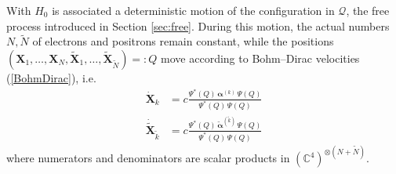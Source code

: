 \documentclass[12pt]{article}
\newcommand{\CCC}{\mathbb{C}} %
\newcommand{\1}{\mathbf{1}} %
\newcommand{\conf}{\mathcal{Q}} %
\newcommand{\vX}{\boldsymbol X}
\newcommand{\valpha}{{\boldsymbol \alpha}}
\newcommand{\pN}{{\widetilde{N}}}
\newcommand{\pk}{{\widetilde{k}}}
\newcommand{\pvX}{\widetilde{\boldsymbol X}}
\newcommand{\palpha}{\widetilde\valpha}
\begin{document}
With $H_0$ is associated a deterministic motion of the configuration
in $\conf$, the free process introduced in Section \ref{sec:free}.
During this motion, the actual numbers $N, \pN$ of electrons and
positrons remain constant, while the positions $(\vX_1, \ldots, \vX_N,
\pvX_1, \ldots, \pvX_\pN)=:Q$ move according to Bohm--Dirac velocities
(\ref{BohmDirac}), i.e.
\begin{subequations}\label{elposmotion}
\begin{align}
   \dot{\vX}_k &= c\frac{\Psi^*(Q) \, \valpha^{(k)} \, \Psi(Q)}
   {\Psi^*(Q) \, \Psi(Q)} \\
   \dot{\pvX}_\pk &= c\frac{\Psi^*(Q) \, \palpha^{(\pk)} \, \Psi(Q)}
   {\Psi^*(Q) \, \Psi(Q)}
\end{align}
\end{subequations}
where numerators and denominators are scalar products in
$(\CCC^4)^{\otimes (N+\pN)}$.
\end{document}
